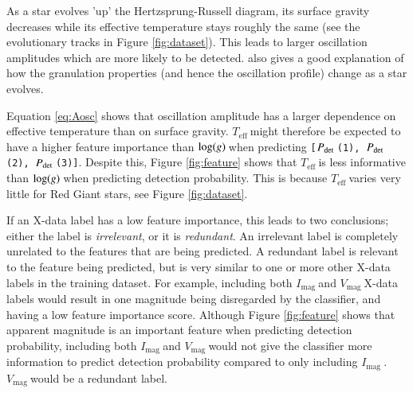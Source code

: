 \documentclass[a4paper,fleqn,usenatbib,useAMS]{mnras}
\newcommand{\numax}{\ensuremath{\nu_{\textrm{max}}}}
\newcommand{\teff}{\ensuremath{T_{\textrm{eff}}\:}}
\newcommand{\pdet}{\ensuremath{P_{\rm det}\:}}
\newcommand{\imag}{\ensuremath{I_{\textrm{mag}}\:}}
\newcommand{\vmag}{\ensuremath{V_{\textrm{mag}}\:}}
\newcommand{\logg}{\ensuremath{{\rm log}(g)\:}}
\begin{document}
As a star evolves 'up' the Hertzsprung-Russell diagram, its surface gravity decreases while its effective temperature stays roughly the same (see the evolutionary tracks in Figure \ref{fig:dataset}). This leads to larger oscillation amplitudes which are more likely to be detected. \citet{mathur_granulation_2011} also gives a good explanation of how the granulation properties (and hence the oscillation profile) change as a star evolves. 


Equation \ref{eq:Aosc} shows that oscillation amplitude has a larger dependence on effective temperature than on surface gravity. \teff might therefore be expected to have a higher feature importance than \logg when predicting \texttt{[\pdet(1), \pdet(2), \pdet(3)]}. Despite this, Figure \ref{fig:feature} shows that \teff is less informative than \logg when predicting detection probability. This is because \teff varies very little for Red Giant stars, see Figure \ref{fig:dataset}.

If an X-data label has a low feature importance, this leads to two conclusions; either the label is {\it irrelevant}, or it is {\it redundant}. An irrelevant label is completely unrelated to the features that are being predicted. A redundant label is relevant to the feature being predicted, but is very similar to one or more other X-data labels in the training dataset. For example, including both \imag and \vmag X-data labels would result in one magnitude being disregarded by the classifier, and having a low feature importance score. Although Figure \ref{fig:feature} shows that apparent magnitude is an important feature when predicting detection probability, including both \imag and \vmag would not give the classifier more information to predict detection probability compared to only including \imag. \vmag would be a redundant label. 
\end{document}
